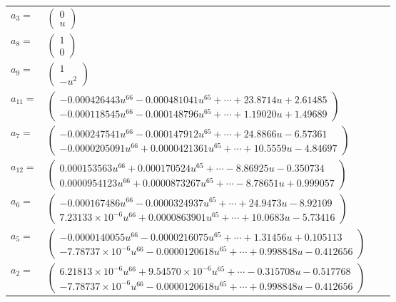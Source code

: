 \documentclass[1p]{elsarticle_modified}
\theoremstyle{definition}
\begin{document}
\begin{tabular}{m{7pt} m{180pt} m{7pt} m{180pt} }
\flushright $a_{3}=$&$\begin{pmatrix}0\\u\end{pmatrix}$ \\
\flushright $a_{8}=$&$\begin{pmatrix}1\\0\end{pmatrix}$ \\
\flushright $a_{9}=$&$\begin{pmatrix}1\\- u^2\end{pmatrix}$ \\
\flushright $a_{11}=$&$\begin{pmatrix}-0.000426443 u^{66}-0.000481041 u^{65}+\cdots+23.8714 u+2.61485\\-0.000118545 u^{66}-0.000148796 u^{65}+\cdots+1.19020 u+1.49689\end{pmatrix}$ \\
\flushright $a_{7}=$&$\begin{pmatrix}-0.000247541 u^{66}-0.000147912 u^{65}+\cdots+24.8866 u-6.57361\\-0.0000205091 u^{66}+0.0000421361 u^{65}+\cdots+10.5559 u-4.84697\end{pmatrix}$ \\
\flushright $a_{12}=$&$\begin{pmatrix}0.000153563 u^{66}+0.000170524 u^{65}+\cdots-8.86925 u-0.350734\\0.0000954123 u^{66}+0.0000873267 u^{65}+\cdots-8.78651 u+0.999057\end{pmatrix}$ \\
\flushright $a_{6}=$&$\begin{pmatrix}-0.000167486 u^{66}-0.0000324937 u^{65}+\cdots+24.9473 u-8.92109\\7.23133\times10^{-6} u^{66}+0.0000863901 u^{65}+\cdots+10.0683 u-5.73416\end{pmatrix}$ \\
\flushright $a_{5}=$&$\begin{pmatrix}-0.0000140055 u^{66}-0.0000216075 u^{65}+\cdots+1.31456 u+0.105113\\-7.78737\times10^{-6} u^{66}-0.0000120618 u^{65}+\cdots+0.998848 u-0.412656\end{pmatrix}$ \\
\flushright $a_{2}=$&$\begin{pmatrix}6.21813\times10^{-6} u^{66}+9.54570\times10^{-6} u^{65}+\cdots-0.315708 u-0.517768\\-7.78737\times10^{-6} u^{66}-0.0000120618 u^{65}+\cdots+0.998848 u-0.412656\end{pmatrix}$ \\

\end{tabular}
\end{document}
